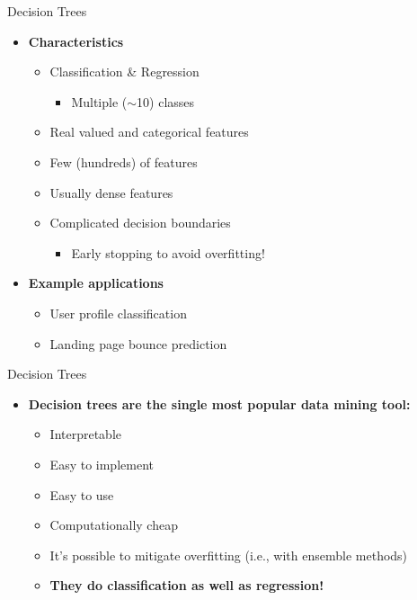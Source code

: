 \begin{frame}[allowframebreaks]{Decision Trees}
    \begin{itemize}
        \item \textbf{Characteristics}
        \begin{itemize}
            \item Classification \& Regression
            \begin{itemize}
                \item Multiple ($\sim$10) classes
            \end{itemize}
            \item Real valued and categorical features
            \item Few (hundreds) of features
            \item Usually dense features
            \item Complicated decision boundaries
            \begin{itemize}
                \item Early stopping to avoid overfitting!
            \end{itemize}
        \end{itemize}
        \item \textbf{Example applications}
        \begin{itemize}
            \item User profile classification
            \item Landing page bounce prediction
        \end{itemize}
    \end{itemize}
\end{frame}


\begin{frame}[allowframebreaks]{Decision Trees}
    \begin{itemize}
        \item \textbf{Decision trees are the single most popular data mining tool:}
        \begin{itemize}
            \item Interpretable
            \item Easy to implement
            \item Easy to use
            \item Computationally cheap
            \item It’s possible to mitigate overfitting (i.e., with ensemble methods)
            \item \textbf{They do classification as well as regression!}
        \end{itemize}
    \end{itemize}
\end{frame}
